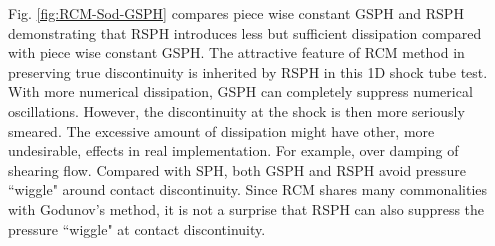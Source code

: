 Fig. \ref{fig:RCM-Sod-GSPH} compares piece wise constant GSPH and RSPH demonstrating that RSPH introduces less but sufficient dissipation compared with piece wise constant GSPH. The attractive feature of RCM method in preserving true discontinuity is inherited by RSPH in this 1D shock tube test. With more numerical dissipation, GSPH can completely suppress numerical oscillations. However, the discontinuity at the shock is then more seriously smeared. The excessive amount of dissipation might have other, more undesirable, effects in real implementation. For example, over damping of shearing flow. Compared with SPH, both GSPH and RSPH avoid pressure ``wiggle" around contact discontinuity. Since RCM shares many commonalities with Godunov's method, it is not a surprise that RSPH can also suppress the pressure ``wiggle" at contact discontinuity.

